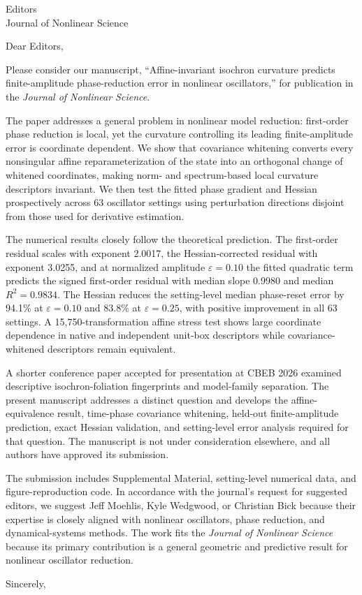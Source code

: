 \documentclass[10pt]{letter}
\date{30 August 2026}
\begin{document}
\begin{letter}{Editors\\Journal of Nonlinear Science}
\opening{Dear Editors,}

Please consider our manuscript, ``Affine-invariant isochron curvature predicts finite-amplitude phase-reduction error in nonlinear oscillators,'' for publication in the \textit{Journal of Nonlinear Science}.

The paper addresses a general problem in nonlinear model reduction: first-order phase reduction is local, yet the curvature controlling its leading finite-amplitude error is coordinate dependent. We show that covariance whitening converts every nonsingular affine reparameterization of the state into an orthogonal change of whitened coordinates, making norm- and spectrum-based local curvature descriptors invariant. We then test the fitted phase gradient and Hessian prospectively across 63 oscillator settings using perturbation directions disjoint from those used for derivative estimation.

The numerical results closely follow the theoretical prediction. The first-order residual scales with exponent 2.0017, the Hessian-corrected residual with exponent 3.0255, and at normalized amplitude $\varepsilon=0.10$ the fitted quadratic term predicts the signed first-order residual with median slope 0.9980 and median $R^2=0.9834$. The Hessian reduces the setting-level median phase-reset error by 94.1\% at $\varepsilon=0.10$ and 83.8\% at $\varepsilon=0.25$, with positive improvement in all 63 settings. A 15,750-transformation affine stress test shows large coordinate dependence in native and independent unit-box descriptors while covariance-whitened descriptors remain equivalent.

A shorter conference paper accepted for presentation at CBEB 2026 examined descriptive isochron-foliation fingerprints and model-family separation. The present manuscript addresses a distinct question and develops the affine-equivalence result, time-phase covariance whitening, held-out finite-amplitude prediction, exact Hessian validation, and setting-level error analysis required for that question. The manuscript is not under consideration elsewhere, and all authors have approved its submission.

The submission includes Supplemental Material, setting-level numerical data, and figure-reproduction code. In accordance with the journal's request for suggested editors, we suggest Jeff Moehlis, Kyle Wedgwood, or Christian Bick because their expertise is closely aligned with nonlinear oscillators, phase reduction, and dynamical-systems methods. The work fits the \textit{Journal of Nonlinear Science} because its primary contribution is a general geometric and predictive result for nonlinear oscillator reduction.

\closing{Sincerely,}
\end{letter}
\end{document}
